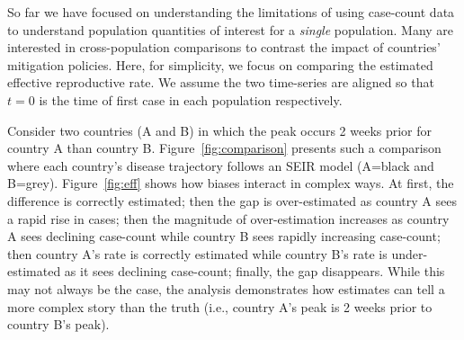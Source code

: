 \documentclass[11pt]{amsart}
\numberwithin{equation}{section}
\theoremstyle{plain}
\begin{document}
 So far we have focused on understanding the limitations of using case-count data to understand population quantities of interest for a \emph{single} population.  Many are interested in cross-population comparisons to contrast the impact of countries' mitigation policies.  Here, for simplicity, we focus on comparing the estimated effective reproductive rate.  We assume the two time-series are aligned so that $t=0$ is the time of first case in each population respectively.

 Consider two countries (A and B) in which the peak occurs 2 weeks prior for country A than country B.  Figure~\ref{fig:comparison} presents such a comparison where each country's disease trajectory follows an SEIR model (A=black and B=grey). Figure~\ref{fig:eff} shows how biases interact in complex ways.  At first, the difference is correctly estimated; then the gap is over-estimated as country A sees a rapid rise in cases; then the magnitude of over-estimation increases as country A sees declining case-count while country B sees rapidly increasing case-count; then country A's rate is correctly estimated while country B's rate is under-estimated as it sees declining case-count; finally, the gap disappears.  While this may not always be the case, the analysis demonstrates how estimates can tell a more complex story than the truth (i.e., country A's peak is 2 weeks prior to country B's peak).
\end{document}
